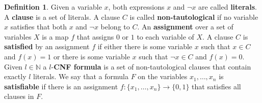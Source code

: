 \documentclass[12pt,notitlepage,a4paper]{article}
\theoremstyle{definition}
\newtheorem{definition}{Definition}[section]
\newcommand{\N}{\mathbb{N}}
\begin{document}
\begin{definition}\label{def:CNF}
Given a variable $x$, both expressions
$x$ and $\neg x$ are called \textbf{literals}. A \textbf{clause}
is a set of literals. A clause $C$ is called \textbf{non-tautological}
if no variable $x$ satisfies that both $x$ and $\neg x$
belong to $C$. An \textbf{assignment} over a set of variables $X$ is a 
map $f$ that assigns $0$ or $1$ to each variable of $X$. A clause $C$
is \textbf{satisfied} by an assignment $f$ if either there is some variable $x$
such that $x\in C$ and $f(x)=1$ or there is some variable $x$ such that
$\neg x\in C$ and $f(x)=0$. 
Given $l\in\N$
a $l$-\textbf{CNF formula} is a set of  non-tautological clauses 
that contain exactly $l$ literals. 
We say that a formula $F$
on the variables $x_1,\dots, x_n$ is \textbf{satisfiable} if there is an
assignment $f:\{x_1,\dots, x_n\}\rightarrow \{0,1\}$ that satisfies all clauses
in $F$. 
\end{definition}
\end{document}
